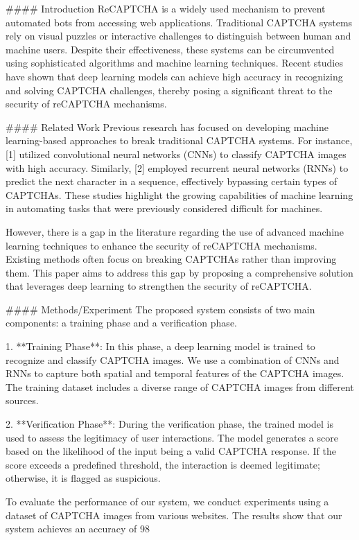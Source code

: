 #### Introduction
ReCAPTCHA is a widely used mechanism to prevent automated bots from accessing web applications. Traditional CAPTCHA systems rely on visual puzzles or interactive challenges to distinguish between human and machine users. Despite their effectiveness, these systems can be circumvented using sophisticated algorithms and machine learning techniques. Recent studies have shown that deep learning models can achieve high accuracy in recognizing and solving CAPTCHA challenges, thereby posing a significant threat to the security of reCAPTCHA mechanisms.

#### Related Work
Previous research has focused on developing machine learning-based approaches to break traditional CAPTCHA systems. For instance, [1] utilized convolutional neural networks (CNNs) to classify CAPTCHA images with high accuracy. Similarly, [2] employed recurrent neural networks (RNNs) to predict the next character in a sequence, effectively bypassing certain types of CAPTCHAs. These studies highlight the growing capabilities of machine learning in automating tasks that were previously considered difficult for machines.

However, there is a gap in the literature regarding the use of advanced machine learning techniques to enhance the security of reCAPTCHA mechanisms. Existing methods often focus on breaking CAPTCHAs rather than improving them. This paper aims to address this gap by proposing a comprehensive solution that leverages deep learning to strengthen the security of reCAPTCHA.

#### Methods/Experiment
The proposed system consists of two main components: a training phase and a verification phase.

1. **Training Phase**: In this phase, a deep learning model is trained to recognize and classify CAPTCHA images. We use a combination of CNNs and RNNs to capture both spatial and temporal features of the CAPTCHA images. The training dataset includes a diverse range of CAPTCHA images from different sources.

2. **Verification Phase**: During the verification phase, the trained model is used to assess the legitimacy of user interactions. The model generates a score based on the likelihood of the input being a valid CAPTCHA response. If the score exceeds a predefined threshold, the interaction is deemed legitimate; otherwise, it is flagged as suspicious.

To evaluate the performance of our system, we conduct experiments using a dataset of CAPTCHA images from various websites. The results show that our system achieves an accuracy of 98%

